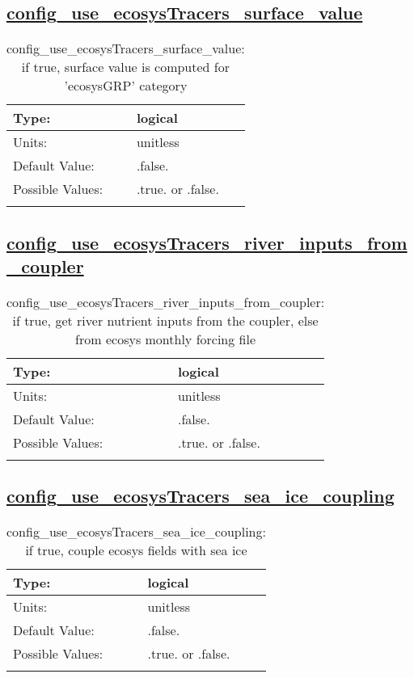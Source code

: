 \subsection[config\_use\_ecosysTracers\_surface\_value]{\hyperref[sec:nm_tab_tracer_forcing_ecosysTracers]{config\_use\_ecosysTracers\_surface\_value}}
\label{subsec:nm_sec_config_use_ecosysTracers_surface_value}
\begin{center}
\begin{longtable}{| p{2.0in} || p{4.0in} |}
    \hline
    Type: & logical \\
    \hline
    Units: & \si{unitless} \\
    \hline
    Default Value: & .false. \\
    \hline
    Possible Values: & .true. or .false. \\
    \hline
    \caption{config\_use\_ecosysTracers\_surface\_value: if true, surface value is computed for 'ecosysGRP' category}
\end{longtable}
\end{center}
\subsection[config\_use\_ecosysTracers\_river\_inputs\_from\_coupler]{\hyperref[sec:nm_tab_tracer_forcing_ecosysTracers]{config\_use\_ecosysTracers\_river\_inputs\_from\_coupler}}
\label{subsec:nm_sec_config_use_ecosysTracers_river_inputs_from_coupler}
\begin{center}
\begin{longtable}{| p{2.0in} || p{4.0in} |}
    \hline
    Type: & logical \\
    \hline
    Units: & \si{unitless} \\
    \hline
    Default Value: & .false. \\
    \hline
    Possible Values: & .true. or .false. \\
    \hline
    \caption{config\_use\_ecosysTracers\_river\_inputs\_from\_coupler: if true, get river nutrient inputs from the coupler, else from ecosys monthly forcing file}
\end{longtable}
\end{center}
\subsection[config\_use\_ecosysTracers\_sea\_ice\_coupling]{\hyperref[sec:nm_tab_tracer_forcing_ecosysTracers]{config\_use\_ecosysTracers\_sea\_ice\_coupling}}
\label{subsec:nm_sec_config_use_ecosysTracers_sea_ice_coupling}
\begin{center}
\begin{longtable}{| p{2.0in} || p{4.0in} |}
    \hline
    Type: & logical \\
    \hline
    Units: & \si{unitless} \\
    \hline
    Default Value: & .false. \\
    \hline
    Possible Values: & .true. or .false. \\
    \hline
    \caption{config\_use\_ecosysTracers\_sea\_ice\_coupling: if true, couple ecosys fields with sea ice}
\end{longtable}
\end{center}
